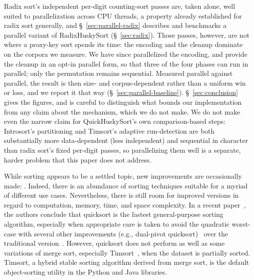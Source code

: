 \documentclass[twoside,leqno,twocolumn]{article}
\begin{document}
Radix sort's independent per-digit counting-sort passes are, taken alone, well suited to
parallelization across CPU threads, a property already established for radix sort generally, and
\S~\ref{sec:parallel-radix} describes and benchmarks a parallel variant of RadixHuskySort
(\S~\ref{sec:radix}).
Those passes, however, are not where a proxy-key sort spends its time: the encoding and the cleanup
dominate on the corpora we measure.
We have since parallelized the encoding, and provide the cleanup in an opt-in parallel form, so that
three of the four phases can run in parallel; only the permutation remains sequential.
Measured parallel against parallel, the result is then size- and corpus-dependent rather than a
uniform win or loss, and we report it that way (\S~\ref{sec:parallel-baseline}).
\S~\ref{sec:conclusion} gives the figures, and is careful to distinguish what bounds our
implementation from any claim about the mechanism, which we do not make.
We do not make even the narrow claim for QuickHuskySort's own comparison-based steps:
Introsort's partitioning and Timsort's adaptive run-detection are both substantially more data-dependent (less independent) and sequential
in character than radix sort's fixed per-digit passes,
so parallelizing them well is a separate, harder problem that this paper does not address.

While sorting appears to be a settled topic, new improvements are occasionally made:
\cite{Dual-pivot,Timsort,doi:10.1137/1.9781611975994.101,10.5555/313559.313859,10.1002/spe.4380231105}.
Indeed, there is an abundance of sorting techniques suitable for a myriad of different use cases.
Nevertheless, there is still room for improved versions in regard to computation, memory, time, and space complexity.
In a recent paper~\cite{sort}, the authors conclude that quicksort is the fastest general-purpose sorting algorithm,
especially when appropriate care is taken to avoid the quadratic worst-case with several other improvements
(e.g., dual-pivot quicksort)~\cite{Dual-pivot} over the traditional version~\cite{10.1145/366622.366644}.
However, quicksort does not perform as well as some variations of merge sort, especially Timsort~\cite{Timsort}, when the dataset is partially sorted.
Timsort, a hybrid stable sorting algorithm derived from merge sort, is the default object-sorting utility in the Python and Java libraries.
\end{document}
